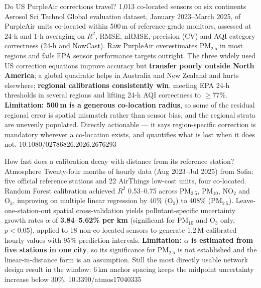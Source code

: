\documentclass[10pt]{article}
\begin{document}
{Do US PurpleAir corrections travel? 1{,}013 co-located sensors on six continents}
{Aerosol Sci Technol}
{Global evaluation dataset, January 2023--March 2025, of PurpleAir units co-located
within 500\,m of reference-grade monitors, assessed at 24-h and 1-h averaging on
$R^2$, RMSE, nRMSE, precision (CV) and AQI category correctness (24-h and NowCast).
Raw PurpleAir overestimates PM$_{2.5}$ in most regions and fails EPA sensor performance
targets outright. The three widely used US correction equations improve accuracy but
\textbf{transfer poorly outside North America}; a global quadratic helps in Australia and
New Zealand and hurts elsewhere; \textbf{regional calibrations consistently win}, meeting
EPA 24-h thresholds in several regions and lifting 24-h AQI correctness to
$\geq$77\%. \textbf{Limitation: 500\,m is a generous co-location radius}, so some of the
residual regional error is spatial mismatch rather than sensor bias, and the regional
strata are unevenly populated. Directly actionable --- it says region-specific correction
is mandatory wherever a co-location exists, and quantifies what is lost when it does not.}
{10.1080/02786826.2026.2676293}

{How fast does a calibration decay with distance from its reference station?}
{Atmosphere}
{Twenty-four months of hourly data (Aug 2023--Jul 2025) from Sofia: five official
reference stations and 22 AirThings low-cost units, four co-located. Random Forest
calibration achieved $R^2$ 0.53--0.75 across PM$_{2.5}$, PM$_{10}$, NO$_2$ and O$_3$,
improving on multiple linear regression by 40\% (O$_3$) to 408\% (PM$_{2.5}$).
Leave-one-station-out spatial cross-validation yields pollutant-specific uncertainty
growth rates $\alpha$ of \textbf{3.84--5.62\% per km} (significant for PM$_{10}$ and
O$_3$ only, $p<0.05$), applied to 18 non-co-located sensors to generate 1.2\,M calibrated
hourly values with 95\% prediction intervals. \textbf{Limitation: $\alpha$ is estimated
from five stations in one city}, so its significance for PM$_{2.5}$ is not established
and the linear-in-distance form is an assumption. Still the most directly usable network
design result in the window: 6\,km anchor spacing keeps the midpoint uncertainty increase
below 30\%.}
{10.3390/atmos17040335}
\end{document}
